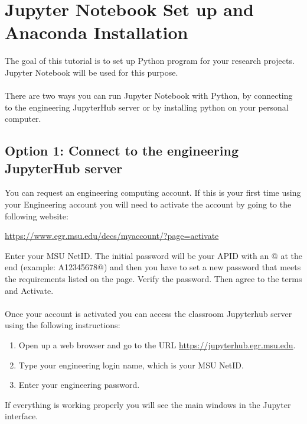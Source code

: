 \documentclass[12pt]{article}   	%
\begin{document}
\section*{Jupyter Notebook Set up and Anaconda Installation}
The goal of this tutorial is to set up Python program for your research projects. Jupyter Notebook will be used for this purpose. \\ \\
There are two ways you can run Jupyter Notebook with Python, by connecting to the engineering JupyterHub server or by installing python on your personal computer.

\subsection*{Option 1: Connect to the engineering JupyterHub server}
You can request an engineering computing account. If this is your first time using your Engineering account you will need to activate the account by
going to the following website: 
\begin{center}
\href{https://www.egr.msu.edu/decs/myaccount/?page=activate}{https://www.egr.msu.edu/decs/myaccount/?page=activate} 
\end{center}
Enter your MSU NetID. The initial password will be your APID with an @ at the end (example: A12345678@) and then you have to set a new password that meets the
requirements listed on the page. Verify the password. Then agree to the terms and Activate. \\ \\
Once your account is activated you can access the classroom Jupyterhub server using the following instructions:
\begin{enumerate}[noitemsep]
\item Open up a web browser and go to the URL \href{https://jupyterhub.egr.msu.edu}{https://jupyterhub.egr.msu.edu}.
\item Type your engineering login name, which is your MSU NetID.
\item Enter your engineering password.
\end{enumerate}
If everything is working properly you will see the main  windows in the Jupyter interface.
\end{document}
